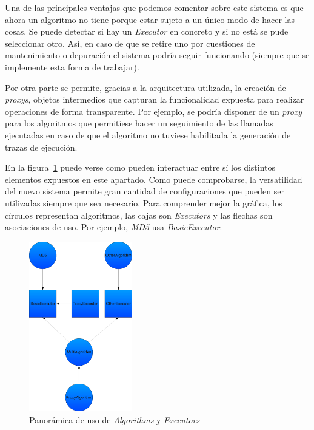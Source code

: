 Una de las principales ventajas que podemos comentar sobre este sistema es que ahora un algoritmo no tiene porque estar sujeto a un único modo de hacer las cosas. Se puede detectar si hay un \emph{Executor} en concreto y si no está se pude seleccionar otro. Así, en caso de que se retire uno por cuestiones de mantenimiento o depuración el sistema podría seguir funcionando (siempre que se implemente esta forma de trabajar).

Por otra parte se permite, gracias a la arquitectura utilizada, la creación de \emph{proxys}, objetos intermedios que capturan la funcionalidad expuesta para realizar operaciones de forma transparente. Por ejemplo, se podría disponer de un \emph{proxy} para los algoritmos que permitiese hacer un seguimiento de las llamadas ejecutadas en caso de que el algoritmo no tuviese habilitada la generación de trazas de ejecución.

En la figura~\ref{fig:alg_ex_prox} puede verse como pueden interactuar entre sí los distintos elementos expuestos en este apartado. Como puede comprobarse, la versatilidad del nuevo sistema permite gran cantidad de configuraciones que pueden ser utilizadas siempre que sea necesario. Para comprender mejor la gráfica, los círculos representan algoritmos, las cajas son \emph{Executors} y las flechas son asociaciones de uso. Por ejemplo, \emph{MD5} usa \emph{BasicExecutor}.

\begin{figure}
	\centering
	\includegraphics[width=0.4\textwidth]{images/algorithms_executors_proxys.pdf}
	\caption{Panorámica de uso de \emph{Algorithms} y \emph{Executors}}\label{fig:alg_ex_prox}
\end{figure}

